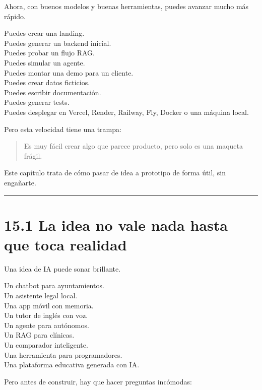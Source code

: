 Ahora, con buenos modelos y buenas herramientas, puedes avanzar mucho
más rápido.

Puedes crear una landing.\\
Puedes generar un backend inicial.\\
Puedes probar un flujo RAG.\\
Puedes simular un agente.\\
Puedes montar una demo para un cliente.\\
Puedes crear datos ficticios.\\
Puedes escribir documentación.\\
Puedes generar tests.\\
Puedes desplegar en Vercel, Render, Railway, Fly, Docker o una máquina
local.

Pero esta velocidad tiene una trampa:

\begin{quote}
Es muy fácil crear algo que parece producto, pero solo es una maqueta
frágil.
\end{quote}

Este capítulo trata de cómo pasar de idea a prototipo de forma útil, sin
engañarte.

\begin{center}\rule{0.5\linewidth}{0.5pt}\end{center}

\section{15.1 La idea no vale nada hasta que toca
realidad}\label{la-idea-no-vale-nada-hasta-que-toca-realidad}

Una idea de IA puede sonar brillante.

Un chatbot para ayuntamientos.\\
Un asistente legal local.\\
Una app móvil con memoria.\\
Un tutor de inglés con voz.\\
Un agente para autónomos.\\
Un RAG para clínicas.\\
Un comparador inteligente.\\
Una herramienta para programadores.\\
Una plataforma educativa generada con IA.

Pero antes de construir, hay que hacer preguntas incómodas:

